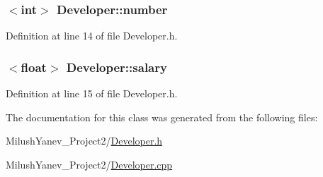 \subsubsection[{number}]{$<$int$>$ Developer\+::number\hspace{0.3cm}{\ttfamily [protected]}}\label{class_developer_af8a79869e44207cd6d3ef176cff2f2d1}


Definition at line 14 of file Developer.\+h.

\hypertarget{class_developer_adcd646e88c19d2570f285715076db8bb}{}
\subsubsection[{salary}]{$<$float$>$ Developer\+::salary\hspace{0.3cm}{\ttfamily [protected]}}\label{class_developer_adcd646e88c19d2570f285715076db8bb}


Definition at line 15 of file Developer.\+h.



The documentation for this class was generated from the following files\+:\begin{DoxyCompactItemize}
\item 
Milush\+Yanev\+\_\+\+Project2/\hyperlink{_developer_8h}{Developer.\+h}\item 
Milush\+Yanev\+\_\+\+Project2/\hyperlink{_developer_8cpp}{Developer.\+cpp}\end{DoxyCompactItemize}
